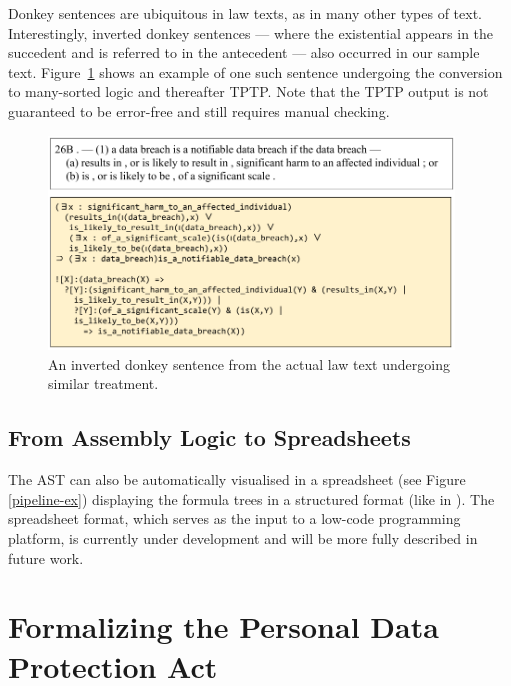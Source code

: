 \documentclass{IOS-Book-Article}
\begin{document}
Donkey sentences are ubiquitous in law texts, as in many other types of text.
Interestingly, inverted donkey sentences --- where the existential appears in the succedent and is referred to in the antecedent --- also occurred in our sample text. Figure~\ref{donkey} shows an example of one such sentence undergoing the conversion to many-sorted logic and thereafter TPTP. Note that the TPTP output is not guaranteed to be error-free and still requires manual checking.

\begin{figure}
\includegraphics[width=0.96\textwidth]{anaphora.png}
\caption{An inverted donkey sentence from the actual law text undergoing similar treatment.}
\label{donkey}
\end{figure}

\subsection{From Assembly Logic to Spreadsheets}
\label{sec:vis:spreadsheets}

The AST can also be automatically visualised in a spreadsheet (see Figure \ref{pipeline-ex}) displaying the formula trees in a structured format (like in \cite{mochales_study_2008}). The spreadsheet format, which serves as the input to a low-code programming platform, is currently under development and will be more fully described in future work.

\section{Formalizing the Personal Data Protection Act}
\label{sec:pdpa}
\end{document}
